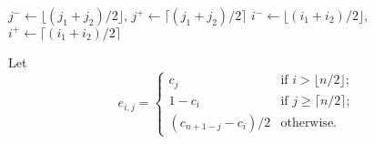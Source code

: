 \documentclass[letterpaper]{article} %
\newtheorem{lemma}[thm]{Lemma}
\DeclareMathOperator{\support}{support}
\begin{document}
	\begin{procedure}
		\DontPrintSemicolon
		$j^- \gets \lfloor (j_1+j_2)/2 \rfloor$,
		$j^+ \gets \lceil (j_1+j_2)/2 \rceil$\;
		$i^- \gets \lfloor (i_1+i_2)/2 \rfloor$,
		$i^+ \gets \lceil (i_1+i_2)/2 \rceil$\;

		
		\caption{{$split(((i_1,j_1),(i_2,j_2)))$}()}
		\label{proc:split}
	\end{procedure}
	
	
	
	Let 
	$$e_{i,j} = \begin{cases}
	c_j   & \text{if } i > \lfloor n/2 \rfloor; \\
	1-c_i & \text{if } j \geq \lceil n/2 \rceil; \\
	(c_{n+1-j} {-} c_i)/2  & \text{otherwise}.
	\end{cases}$$











\end{document}
